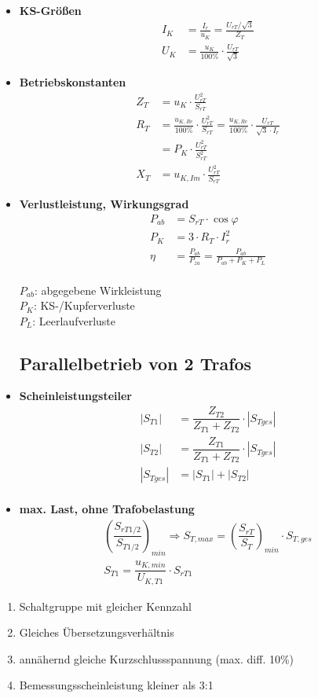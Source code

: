 \begin{itemize}
    \item[]{\textbf{KS-Größen}}
    \begin{align*}
    I_K &= \frac{I_r}{u_K} = \frac{U_{rT}/\sqrt{3}}{Z_T}\\
    U_K &= \frac{u_K}{100\%} \cdot \frac{U_{rT}}{\sqrt{3}}
    \end{align*}

    \item[]{\textbf{Betriebskonstanten}}
    \begin{align*}
    Z_T &= u_K \cdot \frac{U^2_{rT}}{S_{rT}} \\
    R_T &= \frac{u_{K,Re}}{100\%} \cdot \frac{U^2_{rT}}{S_{rT}} =
         \frac{u_{K,Re}}{100\%} \cdot \frac{U_{rT}}{\sqrt{3}\cdot I_r}\\
        &= P_K \cdot \frac{U^2_{rT}}{S^2_{rT}}\\
    X_T &= u_{K,Im} \cdot \frac{U^2_{rT}}{S_{rT}}
    \end{align*}

    \item[]{\textbf{Verlustleistung, Wirkungsgrad}}
\begin{align*}
    P_{ab} &= S_{rT} \cdot \cos \varphi\\
    P_K &= 3 \cdot R_T \cdot I^2_r\\
    \eta &= \frac{P_{ab}}{P_{zu}} = \frac{P_{ab}}{P_{ab}+P_K+P_L}
\end{align*}\\
$P_{ab}$: abgegebene Wirkleistung\\
$P_K$: KS-/Kupferverluste\\
$P_L$: Leerlaufverluste

\subsection{Parallelbetrieb von 2 Trafos}
\item[] \textbf{Scheinleistungsteiler}
\begin{align*}
    |S_{T1}| &= \dfrac{Z_{T2}}{Z_{T1} + Z_{T2}} \cdot |S_{Tges}|\\
    |S_{T2}| &= \dfrac{Z_{T1}}{Z_{T1} + Z_{T2}} \cdot |S_{Tges}|\\
    |S_{Tges}| &= |S_{T1}| + |S_{T2}|\\
\end{align*}

\item[]{\textbf{max. Last, ohne Trafobelastung}}
    \begin{gather*}
    \left(\dfrac{S_{rT1/2}}{S_{T1/2}}\right)_{min} \Rightarrow S_{T,max} = \left(\dfrac{S_{rT}}{S_T}\right)_{min} \cdot S_{T,ges}\\
    S_{T1} = \dfrac{u_{K,min}}{U_{K,T1}} \cdot S_{rT1}
    \end{gather*}
\end{itemize}

\begin{enumerate}
    \item Schaltgruppe mit gleicher Kennzahl
    \item Gleiches Übersetzungsverhältnis
    \item annähernd gleiche Kurzschlussspannung (max. diff. 10\%)
    \item Bemessungsscheinleistung kleiner als 3:1
\end{enumerate}
